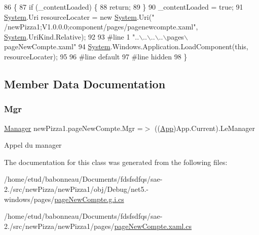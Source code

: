 \begin{DoxyCode}
86                                           \{
87             \textcolor{keywordflow}{if} (\_contentLoaded) \{
88                 \textcolor{keywordflow}{return};
89             \}
90             \_contentLoaded = \textcolor{keyword}{true};
91             \hyperlink{namespaceSystem}{System}.Uri resourceLocater = \textcolor{keyword}{new} \hyperlink{namespaceSystem}{System}.Uri(\textcolor{stringliteral}{"
      /newPizza1;V1.0.0.0;component/pages/pagenewcompte.xaml"}, \hyperlink{namespaceSystem}{System}.UriKind.Relative);
92             
93 \textcolor{preprocessor}{            #line 1 "..\(\backslash\)..\(\backslash\)..\(\backslash\)..\(\backslash\)pages\(\backslash\)pageNewCompte.xaml"}
94             \hyperlink{namespaceSystem}{System}.Windows.Application.LoadComponent(\textcolor{keyword}{this}, resourceLocater);
95             
96 \textcolor{preprocessor}{            #line default}
97 \textcolor{preprocessor}{            #line hidden}
98         \}
\end{DoxyCode}


\subsection{Member Data Documentation}
\mbox{\label{classnewPizza1_1_1pageNewCompte_aba54899728264680a38671ccf9b5dffb}} 
\subsubsection{\texorpdfstring{Mgr}{Mgr}}
{\footnotesize\ttfamily \hyperlink{classModele_1_1Manager}{Manager} new\+Pizza1.\+page\+New\+Compte.\+Mgr =$>$ ((\hyperlink{classnewPizza1_1_1App}{App})App.\+Current).Le\+Manager}



Appel du manager 



The documentation for this class was generated from the following files\+:\begin{DoxyCompactItemize}
\item 
/home/etud/babonneau/\+Documents/fdsfsdfqs/sae-\/2./src/new\+Pizza/new\+Pizza1/obj/\+Debug/net5.-\/windows/pages/\hyperlink{net5_80-windows_2pages_2pageNewCompte_8g_8i_8cs}{page\+New\+Compte.\+g.\+i.\+cs}\item 
/home/etud/babonneau/\+Documents/fdsfsdfqs/sae-\/2./src/new\+Pizza/new\+Pizza1/pages/\hyperlink{pageNewCompte_8xaml_8cs}{page\+New\+Compte.\+xaml.\+cs}\end{DoxyCompactItemize}
